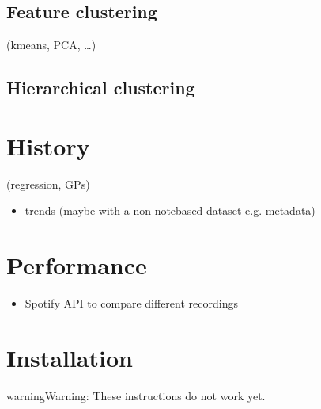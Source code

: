 \documentclass[letterpaper,10pt,english]{sphinxmanual}
\begin{document}
\subsection{Feature clustering}
\label{\detokenize{6_advanced:feature-clustering}}
(k\sphinxhyphen{}means, PCA, …)


\subsection{Hierarchical clustering}
\label{\detokenize{6_advanced:hierarchical-clustering}}

\section{History}
\label{\detokenize{6_advanced:history}}
(regression, GPs)
\begin{itemize}
\item {} 
trends (maybe with a non note\sphinxhyphen{}based dataset e.g. metadata)

\end{itemize}


\section{Performance}
\label{\detokenize{6_advanced:performance}}\begin{itemize}
\item {} 
Spotify API to compare different recordings

\end{itemize}

\cleardoublepage
\begingroup
\renewcommand\chapter[1]{\endgroup}


\chapter{Bibliography}
\label{\detokenize{8_bibliography:bibliography}}\label{\detokenize{8_bibliography::doc}}



\chapter{Developers}
\label{\detokenize{index:developers}}

\section{Installation}
\label{\detokenize{install:installation}}\label{\detokenize{install::doc}}
\begin{sphinxadmonition}{warning}{Warning:}
These instructions do not work yet.
\end{sphinxadmonition}
\end{document}

